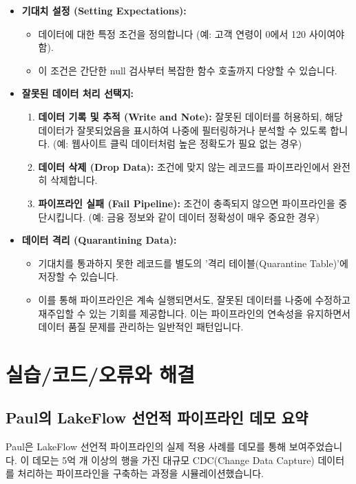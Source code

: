\documentclass[11pt,a4paper]{article}
\theoremstyle{definition}
\newcommand{\newsection}[1]{\newpage\section{#1}}
\begin{document}
\begin{enumerate}
\begin{itemize}
    \item \textbf{기대치 설정 (Setting Expectations):}
    \begin{itemize}
        \item 데이터에 대한 특정 조건을 정의합니다 (예: 고객 연령이 0에서 120 사이여야 함).
        \item 이 조건은 간단한 null 검사부터 복잡한 함수 호출까지 다양할 수 있습니다.
    \end{itemize}
    \item \textbf{잘못된 데이터 처리 선택지:}
    \begin{enumerate}
        \item \textbf{데이터 기록 및 추적 (Write and Note):} 잘못된 데이터를 허용하되, 해당 데이터가 잘못되었음을 표시하여 나중에 필터링하거나 분석할 수 있도록 합니다. (예: 웹사이트 클릭 데이터처럼 높은 정확도가 필요 없는 경우)
        \item \textbf{데이터 삭제 (Drop Data):} 조건에 맞지 않는 레코드를 파이프라인에서 완전히 삭제합니다.
        \item \textbf{파이프라인 실패 (Fail Pipeline):} 조건이 충족되지 않으면 파이프라인을 중단시킵니다. (예: 금융 정보와 같이 데이터 정확성이 매우 중요한 경우)
    \end{enumerate}
    \item \textbf{데이터 격리 (Quarantining Data):}
    \begin{itemize}
        \item 기대치를 통과하지 못한 레코드를 별도의 '격리 테이블(Quarantine Table)'에 저장할 수 있습니다.
        \item 이를 통해 파이프라인은 계속 실행되면서도, 잘못된 데이터를 나중에 수정하고 재주입할 수 있는 기회를 제공합니다. 이는 파이프라인의 연속성을 유지하면서 데이터 품질 문제를 관리하는 일반적인 패턴입니다.
    \end{itemize}
\end{itemize}

\newsection{실습/코드/오류와 해결}

\subsection{Paul의 LakeFlow 선언적 파이프라인 데모 요약}

Paul은 LakeFlow 선언적 파이프라인의 실제 적용 사례를 데모를 통해 보여주었습니다. 이 데모는 5억 개 이상의 행을 가진 대규모 CDC(Change Data Capture) 데이터를 처리하는 파이프라인을 구축하는 과정을 시뮬레이션했습니다.


\end{enumerate}
\end{document}
